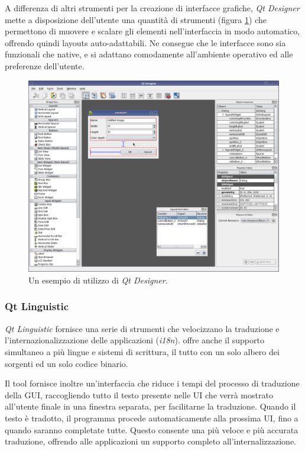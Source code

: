 A differenza di altri strumenti per la creazione di interfacce grafiche, \emph{Qt Designer} mette a disposizione dell'utente una quantità di strumenti (figura \ref{figura:qtdesigner}) che permettono di muovere e scalare gli elementi nell'interfaccia in modo automatico, offrendo quindi layouts auto-adattabili. Ne consegue che le interfacce sono sia funzionali che native, e si adattano comodamente all'ambiente operativo ed alle preferenze dell'utente.

\begin{figure}[!htb]
	\centering
	\includegraphics[width=12cm]{images/qtdesigner.png}
	\caption{Un esempio di utilizzo di \emph{Qt Designer}.}
	\label{figura:qtdesigner}
\end{figure}


\subsubsection{Qt Linguistic}
\emph{Qt Linguistic} fornisce una serie di strumenti che velocizzano la traduzione e l'internazionalizzazione delle applicazioni (\emph{i18n}). \qt{} offre anche il supporto simultaneo a più lingue e sistemi di scrittura, il tutto con un solo albero dei sorgenti ed un solo codice binario.

Il tool fornisce inoltre un'interfaccia che riduce i tempi del processo di traduzione della GUI, raccogliendo tutto il testo presente nelle UI che verrà mostrato all'utente finale in una finestra separata, per facilitarne la traduzione. Quando il testo è tradotto, il programma procede automaticamente alla prossima UI, fino a quando saranno completate tutte. Questo consente una più veloce e più accurata traduzione, offrendo alle applicazioni un supporto completo all'internalizzazione.

